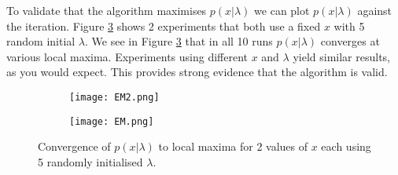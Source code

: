 To validate that the algorithm maximises $p(x|\lambda)$ we can plot $p(x|\lambda)$ against the iteration.
Figure \ref{fig:em} shows 2 experiments that both use a fixed $x$ with 5 random initial $\lambda$.
We see in Figure \ref{fig:em} that in all 10 runs $p(x|\lambda)$ converges at various local maxima.
Experiments using different $x$ and $\lambda$ yield similar results, as you would expect.
This provides strong evidence that the algorithm is valid.

\begin{figure}[h!]
    \begin{center}
    \begin{subfigure}{.5\textwidth}
        \begin{center}
    \texttt{[image: EM2.png]}
    \caption{}
    \label{fig:em1}
    \end{center}
    \end{subfigure}%
    \begin{subfigure}{.5\textwidth}
        \begin{center}
        \texttt{[image: EM.png]}
        \caption{}
        \label{fig:em2}
    \end{center}
        \end{subfigure}%
        \caption{Convergence of $p(x|\lambda)$ to local maxima for 2 values of $x$ each using 5 randomly initialised $\lambda$.}
    \label{fig:em}
    \end{center}
    \end{figure}